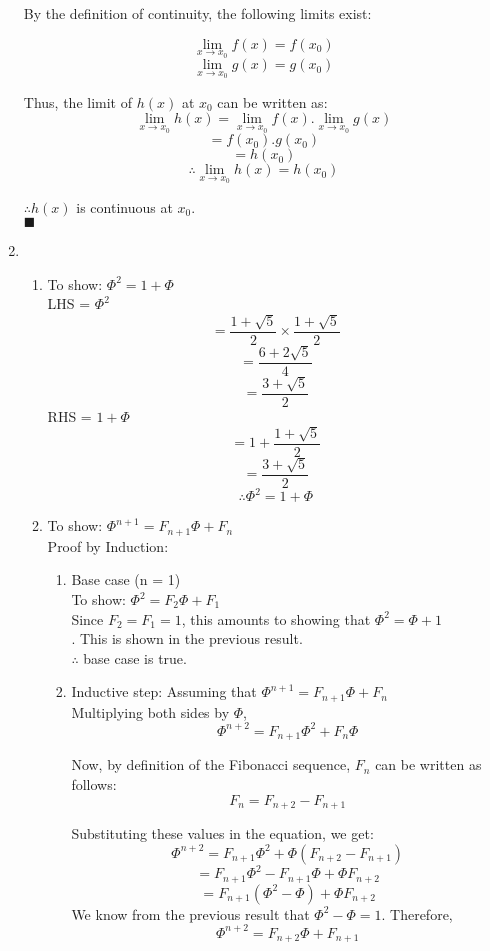 \documentclass[a4paper,12pt]{article} %
\begin{document}
\begin{enumerate}
    By the definition of continuity, the following limits exist:

    $$ \lim_{x \to x_0}f(x) = f(x_0) $$
    $$ \lim_{x \to x_0}g(x) = g(x_0) $$

    Thus, the limit of $h(x)$ at $x_0$ can be written as:
    $$ \lim_{x \to x_0}h(x) = \lim_{x \to x_0}f(x).\lim_{x \to x_0}g(x) $$
    $$  = f(x_0).g(x_0) $$
    $$  = h(x_0) $$
    $$ \therefore \lim_{x \to x_0}h(x) = h(x_0) $$

    $\therefore h(x)$ is continuous at $x_0$.\\
    $\blacksquare$

  \item
    \begin{enumerate}
      \item To show: $\Phi^2 = 1 + \Phi$\\
        LHS = $\Phi^2$
        $$ = \frac{1 + \sqrt{5}}{2} \times \frac{1 + \sqrt{5}}{2} $$
        $$ = \frac{6 + 2\sqrt{5}}{4} $$
        $$ = \frac{3 + \sqrt{5}}{2} $$
        RHS = $1 + \Phi$\\
        $$ = 1 + \frac{1 + \sqrt{5}}{2} $$
        $$ = \frac{3 + \sqrt{5}}{2} $$
        $$ \therefore \Phi^2 = 1 + \Phi$$
      \item To show: $\Phi^{n+1} = F_{n+1}\Phi + F_{n}$\\
        Proof by Induction:\\
        \begin{enumerate}
          \item Base case (n = 1)\\
            To show: $\Phi^{2} = F_{2}\Phi + F_{1}$\\
            Since $F_2 = F_1 = 1$, this amounts to showing that $\Phi^2 = \Phi + 1$\\.
            This is shown in the previous result.\\
            $\therefore$ base case is true.
          \item Inductive step: Assuming that $\Phi^{n+1} = F_{n+1}\Phi + F_{n}$\\
            Multiplying both sides by $\Phi$,\\
            $$\Phi^{n+2} = F_{n+1}\Phi^2 + F_{n}\Phi$$

            Now, by definition of the Fibonacci sequence, $F_{n}$ can be written as follows:
            $$ F_{n} = F_{n+2} - F_{n + 1}$$

            Substituting these values in the equation, we get:
            $$\Phi^{n+2} = F_{n+1}\Phi^2 + \Phi(F_{n+2} - F_{n+1})$$
            $$ = F_{n+1}\Phi^2 - F_{n+1}\Phi + \Phi F_{n+2} $$
            $$ = F_{n+1}(\Phi^2 - \Phi) + \Phi F_{n+2}$$
            We know from the previous result that $\Phi^2 - \Phi = 1$. Therefore,
            $$\Phi^{n+2} = F_{n+2}\Phi + F_{n+1}$$


\end{enumerate}
\end{enumerate}
\end{enumerate}
\end{document}
